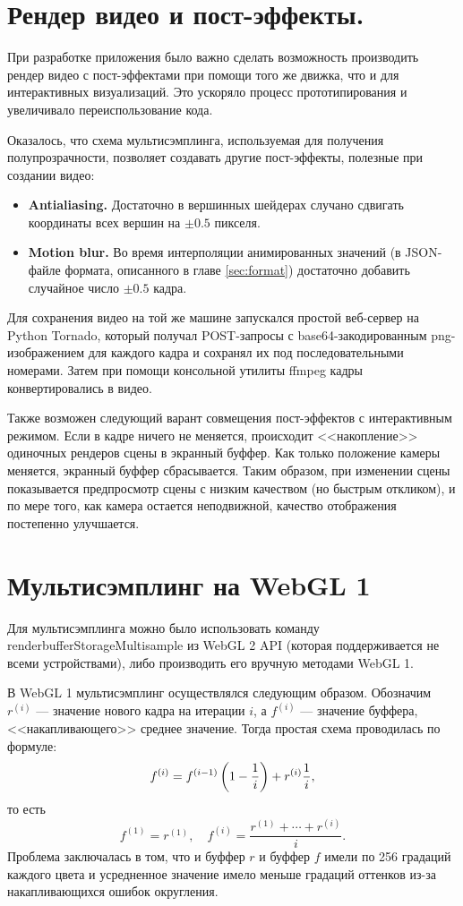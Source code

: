 \section{Рендер видео и пост-эффекты.}

При разработке приложения было важно сделать возможность производить рендер видео с пост-эффектами при помощи того же движка, что и для интерактивных визуализаций. Это ускоряло процесс прототипирования и увеличивало переиспользование кода.

Оказалось, что схема мультисэмплинга, используемая для получения полупрозрачности, позволяет создавать другие пост-эффекты, полезные при создании видео:

\begin{itemize}
\item {\bfseries Antialiasing.} Достаточно в вершинных шейдерах случано сдвигать координаты всех вершин на $\pm 0.5$ пикселя.
\item {\bfseries Motion blur.} Во время интерполяции анимированных значений (в JSON-файле формата, описанного в главе \ref{sec:format}) достаточно добавить случайное число $\pm 0.5$ кадра.
\end{itemize}

Для сохранения видео на той же машине запускался простой веб-сервер на Python Tornado, который получал POST-запросы с base64-закодированным png-изображением для каждого кадра и сохранял их под последовательными номерами. Затем при помощи консольной утилиты ffmpeg кадры конвертировались в видео.

Также возможен следующий варант совмещения пост-эффектов с интерактивным режимом. Если в кадре ничего не меняется, происходит <<накопление>> одиночных рендеров сцены в экранный буффер. Как только положение камеры меняется, экранный буффер сбрасывается. Таким образом, при изменении сцены показывается предпросмотр сцены с низким качеством (но быстрым откликом), и по мере того, как камера остается неподвижной, качество отображения постепенно улучшается. 

\section{Мультисэмплинг на WebGL 1}

Для мультисэмплинга можно было использовать команду renderbufferStorageMultisample из WebGL 2 API (которая поддерживается не всеми устройствами), либо производить его вручную методами WebGL 1.

В WebGL 1 мультисэмплинг осуществлялся следующим образом. Обозначим $r^{(i)}$ --- значение нового кадра на итерации $i$, а $f^{(i)}$ --- значение буффера, <<накапливающего>> среднее значение. Тогда простая схема проводилась по формуле:
$$f^{(i)} = f^{(i-1)} \left(1 - \frac{1}{i}\right) + r^{(i)} \frac{1}{i},$$
то есть
$$f^{(1)} = r^{(1)},\quad f^{(i)} = \frac{r^{(1)} + \cdots + r^{(i)}}{i}.$$
Проблема заключалась в том, что и буффер $r$ и буффер $f$ имели по 256 градаций каждого цвета и усредненное значение имело меньше градаций оттенков из-за накапливающихся ошибок округления.


